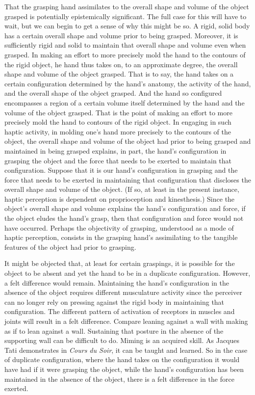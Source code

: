 \documentclass[12pt]{article}
\begin{document}
That the grasping hand assimilates to the overall shape and volume of the object grasped is potentially epistemically significant. The full case for this will have to wait, but we can begin to get a sense of why this might be so. A rigid, solid body has a certain overall shape and volume prior to being grasped. Moreover, it is sufficiently rigid and solid to maintain that overall shape and volume even when grasped. In making an effort to more precisely mold the hand to the contours of the rigid object, he hand thus takes on, to an approximate degree, the overall shape and volume of the object grasped. That is to say, the hand takes on a certain configuration determined by the hand's anatomy, the activity of the hand, and the overall shape of the object grasped. And the hand so configured encompasses a region of a certain volume itself determined by the hand and the volume of the object grasped. That is the point of making an effort to more precisely mold the hand to contours of the rigid object. In engaging in such haptic activity, in molding one's hand more precisely to the contours of the object, the overall shape and volume of the object had prior to being grasped and maintained in being grasped explains, in part, the hand's configuration in grasping the object and the force that needs to be exerted to maintain that configuration. Suppose that it is our hand's configuration in grasping and the force that needs to be exerted in maintaining that configuration that discloses the overall shape and volume of the object. (If so, at least in the present instance, haptic perception is dependent on proprioception and kinesthesis.) Since the object's overall shape and volume explains the hand's configuration and force, if the object eludes the hand's grasp, then that configuration and force would not have occurred. Perhaps the objectivity of grasping, understood as a mode of haptic perception, consists in the grasping hand's assimilating to the tangible features of the object had prior to grasping.

It might be objected that, at least for certain graspings, it is possible for the object to be absent and yet the hand to be in a duplicate configuration. However, a felt difference would remain. Maintaining the hand's configuration in the absence of the object requires different musculature activity since the perceiver can no longer rely on pressing against the rigid body in maintaining that configuration. The different pattern of activation of receptors in muscles and joints will result in a felt difference. Compare leaning against a wall with making as if to lean against a wall. Sustaining that posture in the absence of the supporting wall can be difficult to do. Miming is an acquired skill. As Jacques Tati demonstrates in \emph{Cours du Soir}, it can be taught and learned. So in the case of duplicate configuration, where the hand takes on the configuration it would have had if it were grasping the object, while the hand's configuration has been maintained in the absence of the object, there is a felt difference in the force exerted.
\end{document}
